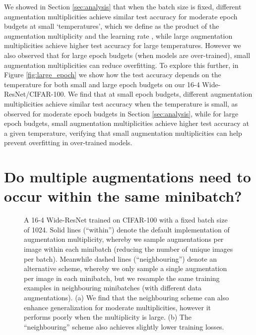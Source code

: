 \documentclass{article}
\begin{document}
We showed in Section \ref{sec:analysis} that when the batch size is fixed, different augmentation multiplicities achieve similar test accuracy for moderate epoch budgets at small `temperatures', which we define as the product of the augmentation multiplicity  and the learning rate , while large augmentation multiplicities achieve higher test accuracy for large temperatures. However we also observed that for large epoch budgets (when models are over-trained), small augmentation multiplicities can reduce overfitting. To explore this further, in Figure \ref{fig:large_epoch} we show how the test accuracy depends on the temperature for both small and large epoch budgets on our 16-4 Wide-ResNet/CIFAR-100. We find that at small epoch budgets, different augmentation multiplicities achieve similar test accuracy when the temperature is small, as observed for moderate epoch budgets in Section \ref{sec:analysis}, while for large epoch budgets, small augmentation multiplicities achieve higher test accuracy at a given temperature, verifying that small augmentation multiplicities can help prevent overfitting in over-trained models.

\section{Do multiple augmentations need to occur within the same minibatch?}
\label{app:ablation}
\begin{figure}[t]
\centering
  \vskip -1mm

  \vskip -2mm
\caption{A 16-4 Wide-ResNet trained on CIFAR-100 with a fixed batch size of 1024. Solid lines (``within'') denote the default implementation of augmentation multiplicity, whereby we sample  augmentations per image within each minibatch (reducing the number of unique images per batch). Meanwhile dashed lines (``neighbouring'') denote an alternative scheme, whereby we only sample a single augmentation per image in each minibatch, but we resample the same training examples in  neighbouring minibatches (with different data augmentations). (a) We find that the neighbouring scheme can also enhance generalization for moderate multiplicities, however it performs poorly when the multiplicity is large. (b) The ``neighbouring'' scheme also achieves slightly lower training losses.}
\label{fig:ablation}
  \vskip -2mm
\end{figure}
\end{document}

